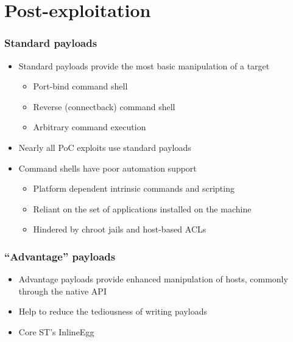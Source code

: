 \documentclass{beamer}
\newenvironment{sitemize}{\vspace{1mm}\begin{itemize}\itemsep 4pt\small}{\end{itemize}}
\begin{document}
\section{Post-exploitation}
\begin{frame}[t]
    \frametitle{Standard payloads}

    \begin{sitemize}
        \item Standard payloads provide the most basic manipulation
        of a target
        \begin{sitemize}
            \item Port-bind command shell
            \item Reverse (connectback) command shell
            \item Arbitrary command execution
        \end{sitemize}

        \pause
        \item Nearly all PoC exploits use standard payloads

        \pause
        \item Command shells have poor automation support
        \begin{sitemize}
            \item Platform dependent intrinsic commands and
            scripting
            \item Reliant on the set of applications installed on the
            machine
            \item Hindered by chroot jails and host-based ACLs
        \end{sitemize}
    \end{sitemize}
\end{frame}

\begin{frame}[t]
    \frametitle{``Advantage'' payloads}

    \begin{sitemize}
        \item Advantage payloads provide enhanced manipulation of
        hosts, commonly through the native API
        \item Help to reduce the tediousness of writing payloads

        \item Core ST's InlineEgg

    \end{sitemize}
\end{frame}
\end{document}
